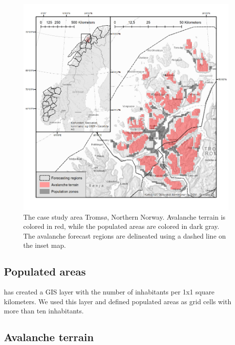 \documentclass[authordate,empirical]{jote-new-article}
\begin{document}
\begin{figure}
  \begin{fullwidth}
    \includegraphics[width=\linewidth]{media/image3.png}
    \caption{The case study area Tromsø, Northern Norway. Avalanche terrain is colored in red, while the populated areas are colored in dark gray. The avalanche forecast regions are delineated using a dashed line on the inset map.}
    \label{fig:rId10}

  \end{fullwidth}
\end{figure}






\subsection{Populated areas}



\textcite{StatisticsNorway2021} has created a GIS layer with the number of inhabitants per 1x1 square kilometers. We used this layer and defined populated areas as grid cells with more than ten inhabitants.







\subsection{Avalanche terrain}
\end{document}

